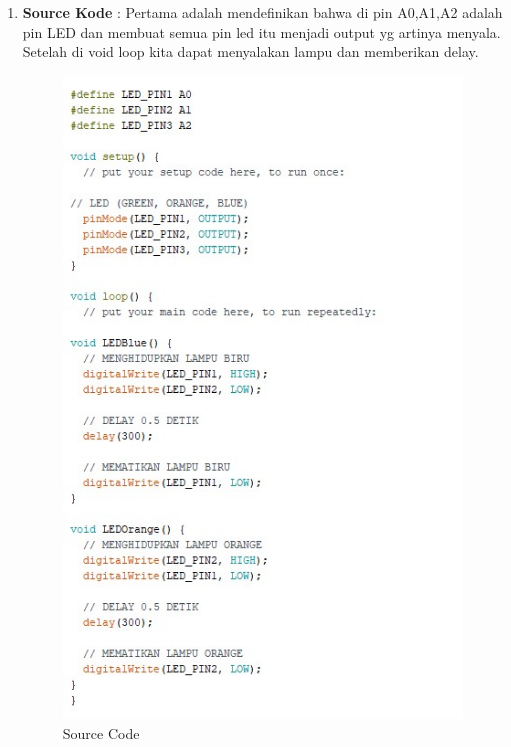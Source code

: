 \begin{enumerate}
\item \textbf{Source Kode} : Pertama adalah mendefinikan bahwa di pin A0,A1,A2 adalah pin LED dan membuat semua pin led itu menjadi output yg artinya menyala. Setelah di void loop kita dapat menyalakan lampu dan memberikan delay.
\begin{figure}[!htbp]
\centering
\includegraphics[width=.75\textwidth]{figures/CONV/cov1.jpg}
\caption{Source Code}\label{fig:cov1}
\end{figure}
\end{enumerate}

